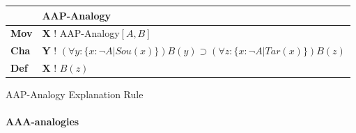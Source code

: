 					\begin{Scheme}[H]\footnotesize
               		\centering
               		\begin{tabular}{l l}
               			                   & \textbf{AAP-Analogy}                                                                                                                                                                                                                                                                               \\ \toprule
               			\textbf{Mov}      & \textbf{X} ! AAP-Analogy$[A,B]$                                                                                                                                                                                                                                                                                     \\ \midrule
               			\textbf{Cha} & \textbf{Y} ! $(\forall y: \{ x: \neg A| Sou(x)\} ) B(y) \supset (\forall z : \{ x: \neg A| Tar(x)\} ) B(z)$                                                                                                                                                                                                                                                                                          \\ \midrule
               			\textbf{Def}   & \textbf{X} ! $B(z)$ \\ \bottomrule
               		\end{tabular}
               		\caption{AAP-Analogy Explanation Rule}
               		\label{AAPAnalogyExplanation}
					\end{Scheme}
					
			\newpage
			\paragraph{AAA-analogies}
			
